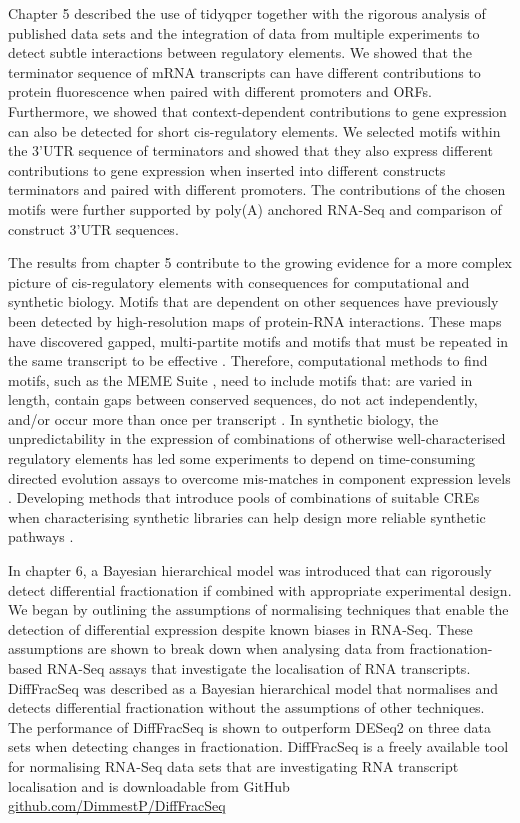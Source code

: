\documentclass[../main.tex]{subfiles}
\begin{document}
Chapter 5 described the use of tidyqpcr together with the rigorous analysis of published data sets and the integration of data from multiple experiments to detect subtle interactions between regulatory elements.
We showed that the terminator sequence of mRNA transcripts can have different contributions to protein fluorescence when paired with different promoters and ORFs.
Furthermore, we showed that context-dependent contributions to gene expression can also be detected for short cis-regulatory elements.
We selected motifs within the 3'UTR sequence of terminators and showed that they also express different contributions to gene expression when inserted into different constructs terminators and paired with different promoters.
The contributions of the chosen motifs were further supported by poly(A) anchored RNA-Seq and comparison of construct 3'UTR sequences.

The results from chapter 5 contribute to the growing evidence for a more complex picture of cis-regulatory elements with consequences for computational and synthetic biology.
Motifs that are dependent on other sequences have previously been detected by high-resolution maps of protein-RNA interactions.
These maps have discovered gapped, multi-partite motifs \parencite{Olivier2005} and motifs that must be repeated in the same transcript to be effective \parencite{Jackson2004, Gu2004}.
Therefore, computational methods to find motifs, such as the MEME Suite \parencite{Bailey2015}, need to include motifs that: are varied in length, contain gaps between conserved sequences, do not act independently, and/or occur more than once per transcript \parencite{Frith2008}.
In synthetic biology, the unpredictability in the expression of combinations of otherwise well-characterised regulatory elements has led some experiments to depend on time-consuming directed evolution assays to overcome mis-matches in component expression levels \parencite{Yokobayashi2002}.
Developing methods that introduce pools of combinations of suitable CREs when characterising synthetic libraries can help design more reliable synthetic pathways  \parencite{Kosuri2013}.

In chapter 6, a Bayesian hierarchical model was introduced that can rigorously detect differential fractionation if combined with appropriate experimental design. 
We began by outlining the assumptions of normalising techniques that enable the detection of differential expression despite known biases in RNA-Seq.
These assumptions are shown to break down when analysing data from fractionation-based RNA-Seq assays that investigate the localisation of RNA transcripts.
DiffFracSeq was described as a Bayesian hierarchical model that normalises and detects differential fractionation without the assumptions of other techniques.
The performance of DiffFracSeq is shown to outperform DESeq2 on three data sets when detecting changes in fractionation.
DiffFracSeq is a freely available tool for normalising RNA-Seq data sets that are investigating RNA transcript localisation and is downloadable from GitHub \href{https://github.com/DimmestP/DiffFracSeq}{github.com/DimmestP/DiffFracSeq}
\end{document}
